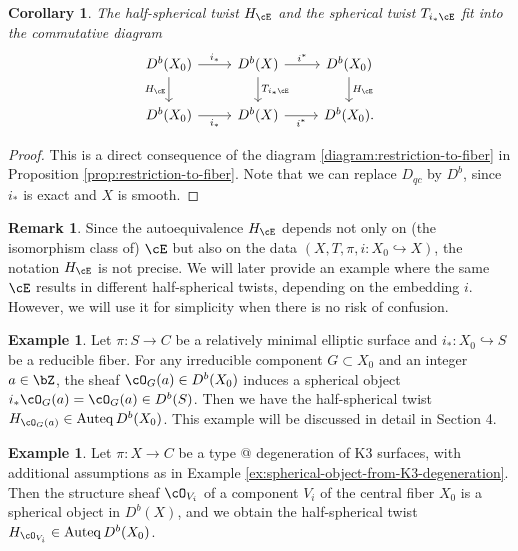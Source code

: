 \documentclass[12pt]{amsart}
\makeatletter
\numberwithin{equation}{section}
\theoremstyle{plain}
\newtheorem{corollary}[theorem]{Corollary}
\theoremstyle{definition}
\newtheorem{example}[theorem]{Example}
\newtheorem{remark}[theorem]{Remark}
\DeclareMathOperator{\Auteq}{\mathrm{Auteq}}
\newcommand*{\rom}[1]{\expandafter\@slowromancap\romannumeral #1@}
\makeatother
\begin{document}
\begin{corollary}\label{cor:compatibility-of-half-spherical-twists-and-spherical-twists}
    The half-spherical twist $H_{\cE}$ and the spherical twist $T_{i_*{\cE}}$ fit into the commutative diagram
    \begin{equation}
        \begin{tikzcd}
            D^b(X_0) \ar[r, "i_*"] \ar[d, "H_{\cE}"'] & D^b(X) \ar[r, "i^*"]\ar[d, "T_{i_*{\cE}}"] & D^b(X_0) \ar[d,  "H_{\cE}"]\\
            D^b(X_0) \ar[r, "i_*"'] & D^b(X) \ar[r, "i^*"'] & D^b(X_0).
        \end{tikzcd}
    \end{equation}
\end{corollary}
\begin{proof}
    This is a direct consequence of the diagram \eqref{diagram:restriction-to-fiber} in Proposition \ref{prop:restriction-to-fiber}.
    Note that we can replace $D_{qc}$ by $D^b$, since $i_*$ is exact and $X$ is smooth.
\end{proof}

\begin{remark}
    Since the autoequivalence $H_{\cE}$ depends not only on (the isomorphism class of) $\cE$ but also on the data $(X, T, \pi, i \colon X_0 \hookrightarrow X)$, the notation $H_{\cE}$ is not precise.
    We will later provide an example where the same $\cE$ results in different half-spherical twists, depending on the embedding $i$.
    However, we will use it for simplicity when there is no risk of confusion.
\end{remark}


\begin{example}\label{ex:half-spherical-twist-from-kodaira-fiber}
    Let $\pi \colon S \to C$ be a relatively minimal elliptic surface and $i_* \colon X_0 \hookrightarrow S$ be a reducible fiber.
    For any irreducible component $G \subset X_0$ and an integer $a \in \bZ$, the sheaf $\cO_G(a) \in D^b(X_0)$ induces a spherical object $i_*\cO_G(a)=\cO_G(a) \in D^b(S)$.
    Then we have the half-spherical twist $H_{\cO_G(a)} \in \Auteq D^b(X_0)$.
    This example will be discussed in detail in Section 4.
\end{example}


\begin{example}\label{ex:K3-degeneration}
    Let $\pi \colon X \to C$ be a type \rom{3} degeneration of K3 surfaces, with additional assumptions as in Example \ref{ex:spherical-object-from-K3-degeneration}.
    Then the structure sheaf $\cO_{V_i}$ of a component $V_i$ of the central fiber $X_0$ is a spherical object in $D^b(X)$, and we obtain the half-spherical twist $H_{\cO_{V_i}} \in \Auteq D^b(X_0)$.
\end{example}
\end{document}
